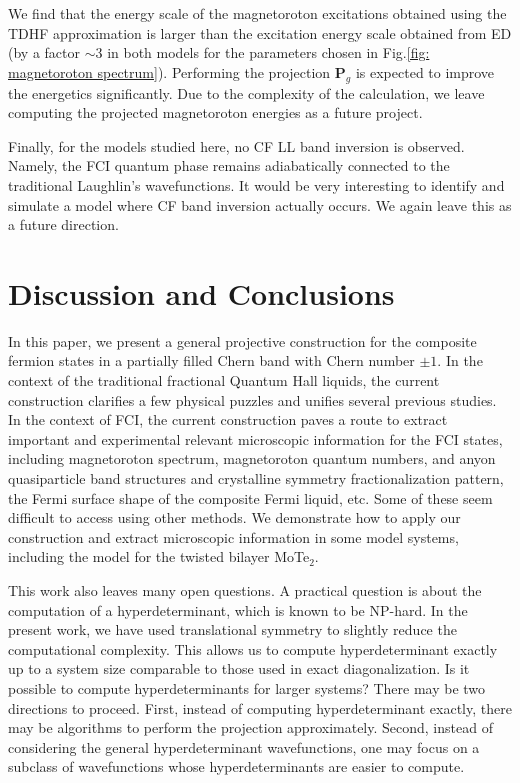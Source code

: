 We find that the energy scale of the magnetoroton excitations obtained using the TDHF approximation is larger than the excitation energy scale obtained from ED (by a factor $\sim 3$ in both models for the parameters chosen in Fig.\ref{fig: magnetoroton spectrum}). Performing the projection $\mathbf P_g$ is expected to improve the energetics significantly. Due to the complexity of the calculation, we leave computing the projected magnetoroton energies as a future project.

Finally, for the models studied here, no CF LL band inversion is observed. Namely, the FCI quantum phase remains adiabatically connected to the traditional Laughlin's wavefunctions. It would be very interesting to identify and simulate a model where CF band inversion actually occurs. We again leave this as a future direction.

\section{Discussion and Conclusions}\label{sec:conclusion}
In this paper, we present a general projective construction for the composite fermion states in a partially filled Chern band with Chern number $\pm 1$. In the context of the traditional fractional Quantum Hall liquids, the current construction clarifies a few physical puzzles and unifies several previous studies. In the context of FCI, the current construction paves a route to extract important and experimental relevant microscopic information for the FCI states, including magnetoroton spectrum, magnetoroton quantum numbers, and anyon quasiparticle band structures and  crystalline symmetry fractionalization pattern, the Fermi surface shape of the composite Fermi liquid, etc. Some of these seem difficult to access using other methods. We demonstrate how to apply our construction and extract microscopic information in some model systems, including the model for the twisted bilayer MoTe$_2$.

This work also leaves many open questions. A practical question is about the computation of a hyperdeterminant, which is known to be NP-hard. In the present work, we have used translational symmetry to slightly reduce the computational complexity. This allows us to compute hyperdeterminant exactly up to a system size comparable to those used in exact diagonalization. Is it possible to compute hyperdeterminants for larger systems? There may be two directions to proceed. First, instead of computing hyperdeterminant exactly, there may be algorithms to perform the projection approximately. Second, instead of considering the general hyperdeterminant wavefunctions, one may focus on a subclass of wavefunctions whose hyperdeterminants are easier to compute.

